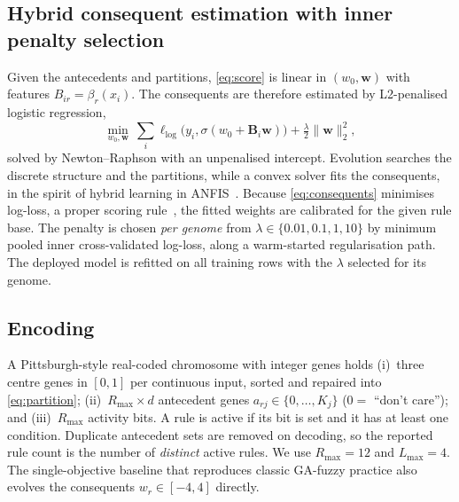 \subsection{Hybrid consequent estimation with inner penalty selection}
Given the antecedents and partitions, \eqref{eq:score} is linear in $(w_0,\mathbf w)$
with features $B_{ir}=\beta_r(x_i)$. The consequents are therefore estimated by
L2-penalised logistic regression,
\begin{equation}
\min_{w_0,\mathbf w}\ \sum_i \ell_{\log}\big(y_i,\sigma(w_0+\mathbf B_i\mathbf w)\big)+\tfrac{\lambda}{2}\|\mathbf w\|_2^2,
\label{eq:consequents}
\end{equation}
solved by Newton--Raphson with an unpenalised intercept. Evolution searches the
discrete structure and the partitions, while a convex solver fits the
consequents, in the spirit of hybrid learning in ANFIS~\cite{jang1993}. Because
\eqref{eq:consequents} minimises log-loss, a proper scoring rule~\cite{gneiting2007}, the
fitted weights are calibrated for the given rule base. The penalty is chosen
\emph{per genome} from $\lambda\in\{0.01,0.1,1,10\}$ by minimum pooled inner
cross-validated log-loss, along a warm-started regularisation path. The
deployed model is refitted on all training rows with the $\lambda$ selected for its
genome.

\subsection{Encoding}
A Pittsburgh-style real-coded chromosome with integer genes holds
(i)~three centre genes in $[0,1]$ per continuous input, sorted and repaired into
\eqref{eq:partition};
(ii)~$R_{\max}\times d$ antecedent genes $a_{rj}\in\{0,\dots,K_j\}$ ($0=$ ``don't care'');
and (iii)~$R_{\max}$ activity bits. A rule is active if its bit is set and it has at
least one condition. Duplicate antecedent sets are removed on decoding, so the
reported rule count is the number of \emph{distinct} active rules. We use $R_{\max}=12$
and $L_{\max}=4$. The single-objective baseline that reproduces classic GA-fuzzy
practice also evolves the consequents $w_r\in[-4,4]$ directly.

